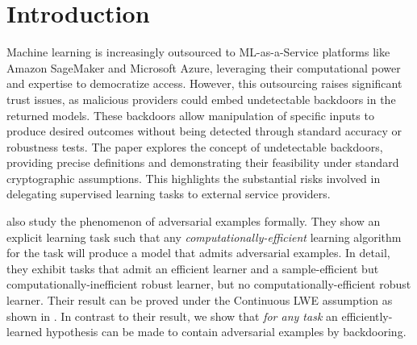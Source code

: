 \documentclass[preprint,11pt]{elsarticle}
\begin{document}
\titleformat{\subsection}[block]{\normalfont\bfseries}{\thesubsection}{1em}{}
\renewcommand\thesubsection{\thesection.\arabic{subsection}}

\section{Introduction}
Machine learning is increasingly outsourced to ML-as-a-Service platforms like Amazon SageMaker and Microsoft Azure, leveraging their computational power and expertise to democratize access. However, this outsourcing raises significant trust issues, as malicious providers could embed undetectable backdoors in the returned models. These backdoors allow manipulation of specific inputs to produce desired outcomes without being detected through standard accuracy or robustness tests. The paper explores the concept of undetectable backdoors, providing precise definitions and demonstrating their feasibility under standard cryptographic assumptions. This highlights the substantial risks involved in delegating supervised learning tasks to external service providers.

\newpage
% 
% 



\noindent \cite{bubeck2019adversarial} also study the phenomenon of adversarial examples formally.
They show an explicit learning task such that any {\em computationally-efficient} learning algorithm for the task will produce a model that admits adversarial examples.
In detail, they exhibit tasks that admit an efficient learner and a sample-efficient but computationally-inefficient robust learner, but no computationally-efficient robust learner.
Their result can be proved under the Continuous LWE assumption as shown in \cite{BST21}.
In contrast to their result, we show that {\em for any task} an efficiently-learned hypothesis can be made to contain adversarial examples by backdooring.
\end{document}
